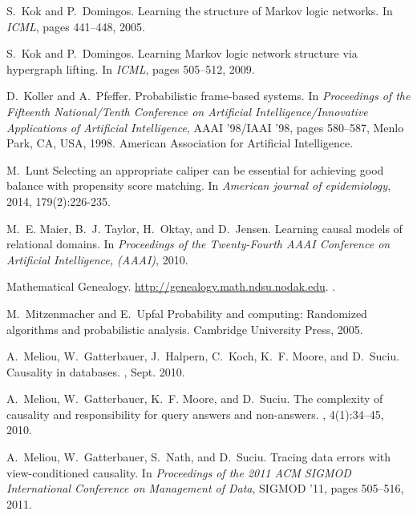 \begin{thebibliography}{10}
S.~Kok and P.~Domingos.
\newblock Learning the structure of {M}arkov logic networks.
\newblock In {\em ICML}, pages 441--448, 2005.

S.~Kok and P.~Domingos.
\newblock Learning {M}arkov logic network structure via hypergraph lifting.
\newblock In {\em ICML}, pages 505--512, 2009.

D.~Koller and A.~Pfeffer.
\newblock Probabilistic frame-based systems.
\newblock In {\em Proceedings of the Fifteenth National/Tenth Conference on
  Artificial Intelligence/Innovative Applications of Artificial Intelligence},
  AAAI '98/IAAI '98, pages 580--587, Menlo Park, CA, USA, 1998. American
  Association for Artificial Intelligence.





M.~Lunt
\newblock Selecting an appropriate caliper can be essential for achieving good balance with propensity score matching.
\newblock In {\em American journal of epidemiology}, 2014, 179(2):226-235.





M.~E. Maier, B.~J. Taylor, H.~Oktay, and D.~Jensen.
\newblock Learning causal models of relational domains.
\newblock In {\em Proceedings of the Twenty-Fourth {AAAI} Conference on
  Artificial Intelligence, (AAAI)}, 2010.

{Mathematical Genealogy}.
\newblock \mbox{\url{http://genealogy.math.ndsu.nodak.edu}}.
.


M.~Mitzenmacher and E.~Upfal
\newblock Probability and computing: Randomized algorithms and probabilistic analysis.
\newblock  Cambridge University Press, 2005.



A.~Meliou, W.~Gatterbauer, J.~Halpern, C.~Koch, K.~F. Moore, and D.~Suciu.
\newblock Causality in databases.
, Sept. 2010.

A.~Meliou, W.~Gatterbauer, K.~F. Moore, and D.~Suciu.
\newblock The complexity of causality and responsibility for query answers and
  non-answers.
, 4(1):34--45, 2010.

A.~Meliou, W.~Gatterbauer, S.~Nath, and D.~Suciu.
\newblock Tracing data errors with view-conditioned causality.
\newblock In {\em Proceedings of the 2011 ACM SIGMOD International Conference
  on Management of Data}, SIGMOD '11, pages 505--516, 2011.


\end{thebibliography}
